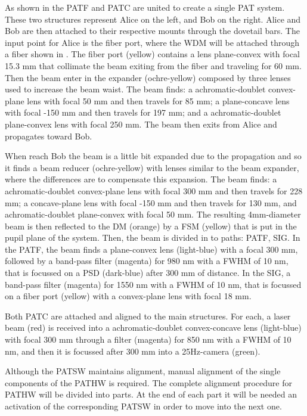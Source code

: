 
As shown in the  PATF and PATC are united to create a single PAT system. These two structures represent Alice on the left, and Bob on the right. Alice and Bob are then attached to their respective mounts through the dovetail bars.
The input point for Alice is the fiber port, where the WDM will be attached through a fiber shown in . The fiber port (yellow) contains a lens plane-convex with focal 15.3 mm that collimate the beam exiting from the fiber and traveling for 60 mm. Then the beam enter in the expander (ochre-yellow) composed by three lenses used to increase the beam waist. The beam finds: a achromatic-doublet convex-plane lens with focal 50 mm and then travels for 85 mm; a plane-concave lens with focal -150 mm and then travels for 197 mm; and a achromatic-doublet plane-convex lens with focal 250 mm. The beam then exits from Alice and propagates toward Bob.

When reach Bob the beam is a little bit expanded due to the propagation and so it finds a beam reducer (ochre-yellow) with lenses similar to the beam expander, where the differences are to compensate this expansion. The beam finds: a achromatic-doublet convex-plane lens with focal 300 mm and then travels for 228 mm; a concave-plane lens with focal -150 mm and then travels for 130 mm, and achromatic-doublet plane-convex with focal 50 mm. The resulting 4mm-diameter beam is then reflected to the DM (orange) by a FSM (yellow) that is put in the pupil plane of the system. Then, the beam is divided in to paths: PATF, SIG.
In the PATF, the beam finds a plane-convex lens (light-blue) with a focal 300 mm, followed by a band-pass filter (magenta) for 980 nm with a FWHM of 10 nm, that is focussed on a PSD (dark-blue) after 300 mm of distance.
In the SIG, a band-pass filter (magenta) for 1550 nm with a FWHM of 10 nm, that is focussed on a fiber port (yellow) with a convex-plane lens with focal 18 mm.

Both PATC are attached and aligned to the main structures. For each, a laser beam (red) is received into a achromatic-doublet convex-concave lens (light-blue) with focal 300 mm through a filter (magenta) for 850 nm with a FWHM of 10 nm, and then it is focussed after 300 mm into a 25Hz-camera (green).

Although the PATSW maintains alignment, manual alignment of the single components of the PATHW is required.
The complete alignment procedure for PATHW will be divided into parts. At the end of each part it will be needed an activation of the corresponding PATSW in order to move into the next one.

